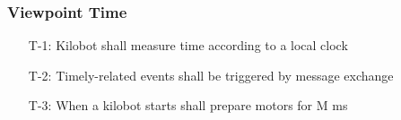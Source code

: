\documentclass{beamer}
\begin{document}
\begin{frame}
\frametitle{Viewpoint Time}
\begin{enumerate}[align=left]
	\item[T-1:] Kilobot shall measure time according to a local clock
	\item[T-2:] Timely-related events shall be triggered by message exchange 
	\item[T-3:] When a kilobot starts shall prepare motors for M ms
\end{enumerate}
\end{frame}
\end{document}
